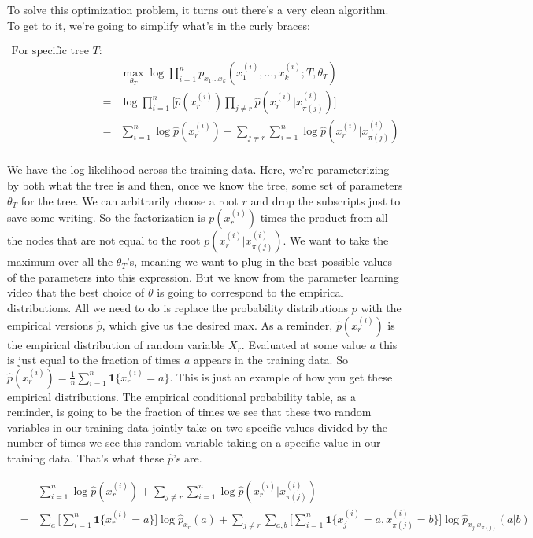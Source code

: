 To solve this optimization problem, it turns out there's a very clean algorithm. To get to it, we're going to simplify what's in the curly braces:

\begin{eqnarray*}
\text{For specific tree } T: \\
& & \max_{\theta_T} \log \prod_{i=1}^n p_{x_1 \dots x_k} (x_1^{(i)},\dots ,x_k^{(i)}; T, \theta_T)  \\&=& \log \prod_{i=1}^n \bigg[ \widehat{p}(x_r^{(i)}) \prod_{j \ne r} \widehat{p}(x_r^{(i)} | x_{\pi(j)}^{(i)}) \bigg] \\
&=& \sum_{i=1}^n \log \widehat{p}(x_r^{(i)}) + \sum_{j \ne r} \sum_{i=1}^n \log \widehat{p}(x_r^{(i)} | x_{\pi(j)}^{(i)}) \\
\end{eqnarray*}

We have the log likelihood across the training data. Here, we're parameterizing by both what the tree is and then, once we know the tree, some set of parameters $\theta_T$ for the tree. We can arbitrarily choose a root $r$ and drop the subscripts just to save some writing. So the factorization is $p(x_r^{(i)})$ times the product from all the nodes that are not equal to the root $p(x_r^{(i)} | x_{\pi(j)}^{(i)})$. We want to take the maximum over all the $\theta_T$'s, meaning we want to plug in the best possible values of the parameters into this expression. But we know from the parameter learning video that the best choice of $\theta$ is going to correspond to the empirical distributions. All we need to do is replace the probability distributions $p$ with the empirical versions $\widehat{p}$, which give us the desired max. As a reminder, $\widehat{p}(x_r^{(i)})$ is the empirical distribution of random variable $X_r$. Evaluated at some value $a$ this is just equal to the fraction of times $a$ appears in the training data. So $\widehat{p}(x_r^{(i)}) = \frac{1}{n} \sum_{i=1}^n \mathbf{1} \{x_r^{(i)}=a\}$. This is just an example of how you get these empirical distributions. The empirical conditional probability table, as a reminder, is going to be the fraction of times we see that these two random variables in our training data jointly take on two specific values divided by the number of times we see this random variable taking on a specific value in our training data. That's what these $\widehat{p}$'s are. 

\begin{eqnarray*}
& & \sum_{i=1}^n \log \widehat{p}(x_r^{(i)}) + \sum_{j \ne r} \sum_{i=1}^n \log \widehat{p}(x_r^{(i)} | x_{\pi(j)}^{(i)}) \\
&=& \sum_a \bigg[ \sum_{i=1}^n \mathbf{1} \{ x_r^{(i)} = a\} \bigg] \log \widehat{p}_{x_r} (a) + \sum_{j \ne r} \sum_{a,b} \bigg[ \sum_{i=1}^n \mathbf{1} \{ x_j^{(i)} = a, x_{\pi(j)}^{(i)} = b \} \bigg] \log \widehat{p}_{x_j | x_{\pi(j)}} (a|b) 
\end{eqnarray*}

